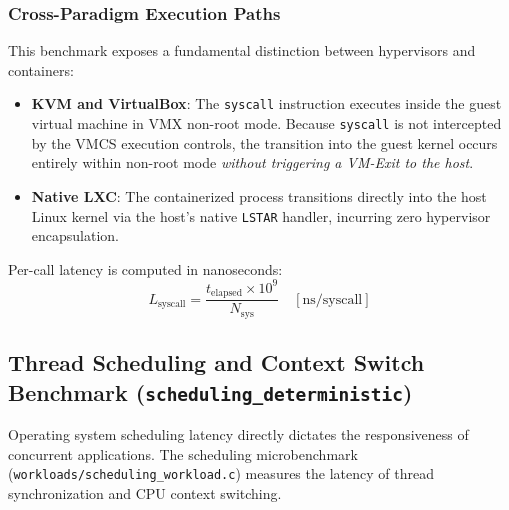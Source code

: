 \subsubsection{Cross-Paradigm Execution Paths}
This benchmark exposes a fundamental distinction between hypervisors and containers:
\begin{itemize}
    \item \textbf{KVM and VirtualBox}: The \texttt{syscall} instruction executes inside the guest virtual machine in VMX non-root mode. Because \texttt{syscall} is not intercepted by the VMCS execution controls, the transition into the guest kernel occurs entirely within non-root mode \textit{without triggering a VM-Exit to the host}.
    \item \textbf{Native LXC}: The containerized process transitions directly into the host Linux kernel via the host's native \texttt{LSTAR} handler, incurring zero hypervisor encapsulation.
\end{itemize}
Per-call latency is computed in nanoseconds:
\begin{equation}
    L_{\text{syscall}} = \frac{t_{\text{elapsed}} \times 10^9}{N_{\text{sys}}} \quad [\text{ns/syscall}]
\end{equation}

\subsection{Thread Scheduling and Context Switch Benchmark (\texttt{scheduling\_deterministic})}
\label{subsec:scheduling_methodology}

Operating system scheduling latency directly dictates the responsiveness of concurrent applications. The scheduling microbenchmark (\texttt{workloads/scheduling\_workload.c}) measures the latency of thread synchronization and CPU context switching.

